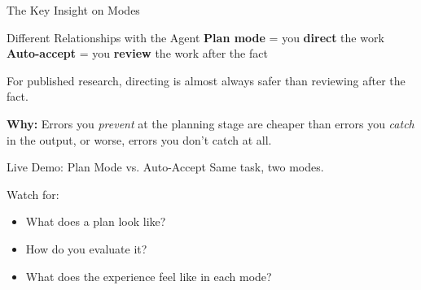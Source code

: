 \documentclass[aspectratio=169, 11pt]{beamer}
\begin{document}
\begin{frame}{The Key Insight on Modes}
  \begin{alertblock}{Different Relationships with the Agent}
    \textbf{Plan mode} = you \textbf{direct} the work\\
    \textbf{Auto-accept} = you \textbf{review} the work after the fact
  \end{alertblock}

  \vspace{0.8em}
  For published research, directing is almost always safer than reviewing after the fact.

  \vspace{0.5em}
  \textbf{Why:} Errors you \textit{prevent} at the planning stage are cheaper than errors you \textit{catch} in the output, or worse, errors you don't catch at all.
\end{frame}


\begin{frame}{Live Demo: Plan Mode vs. Auto-Accept}
  \centering
  \vfill
  Same task, two modes.

  \vspace{0.5em}
  Watch for:
  \begin{itemize}
    \item What does a plan look like?
    \item How do you evaluate it?
    \item What does the experience feel like in each mode?
  \end{itemize}
  \vfill
\end{frame}

\end{document}
